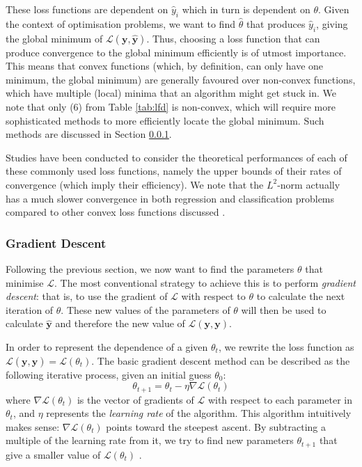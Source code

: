 \documentclass[a4paper,11pt,titlepage]{article}
\theoremstyle{definition}
\theoremstyle{plain}
\theoremstyle{remark}
\begin{document}
These loss functions are dependent on $\hat{y}_i$ which in turn is dependent on $\theta$. Given the context of optimisation problems, we want to find $\hat{\theta}$ that produces $\hat{y}_i$, giving the global minimum of $\mathcal{L}(\mathbf{y}, \mathbf{\hat{y}})$. Thus, choosing a loss function that can produce convergence to the global minimum efficiently is of utmost importance. This means that convex functions (which, by definition, can only have one minimum, the global minimum) are generally favoured over non-convex functions, which have multiple (local) minima that an algorithm might get stuck in. We note that only (6) from Table \ref{tab:lfd} is non-convex, which will require more sophisticated methods to more efficiently locate the global minimum. Such methods are discussed in Section \ref{sec:gd}.

Studies have been conducted to consider the theoretical performances of each of these commonly used loss functions, namely the upper bounds of their rates of convergence (which imply their efficiency). We note that the $L^2$-norm actually has a much slower convergence in both regression and classification problems compared to other convex loss functions discussed \cite{Rosasco2004}.

\subsubsection{Gradient Descent}
\label{sec:gd}

Following the previous section, we now want to find the parameters $\theta$ that minimise $\mathcal{L}$. The most conventional strategy to achieve this is to perform \textit{gradient descent}: that is, to use the gradient of $\mathcal{L}$ with respect to $\theta$ to calculate the next iteration of $\theta$. These new values of the parameters of $\theta$ will then be used to calculate $\mathbf{\hat{y}}$ and therefore the new value of $\mathcal{L}(\mathbf{y}, \mathbf{y})$. 

In order to represent the dependence of a given $\theta_t$, we rewrite the loss function as $\mathcal{L}(\mathbf{y},\mathbf{\hat{y}}) = \mathcal{L}(\theta_t)$. The basic gradient descent method can be described as the following iterative process, given an initial guess $\theta_0$:
$$
\theta_{t+1} = \theta_t - \eta \nabla\mathcal{L}(\theta_t)
$$
where $\nabla\mathcal{L}(\theta_t)$ is the vector of gradients of $\mathcal{L}$ with respect to each parameter in $\theta_t$, and $\eta$ represents the \textit{learning rate} of the algorithm. This algorithm intuitively makes sense: $\nabla\mathcal{L}(\theta_t)$ points toward the steepest ascent. By subtracting a multiple of the learning rate from it, we try to find new parameters $\theta_{t+1}$ that give a smaller value of $\mathcal{L}(\theta_t)$ \cite{nazarathy2021}. 
\end{document}
